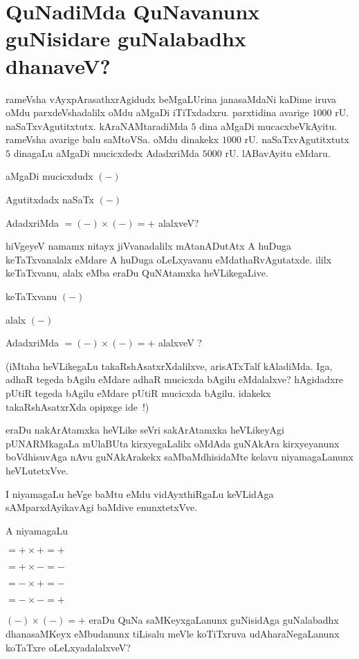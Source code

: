 \chapter{QuNadiMda QuNavanunx guNisidare guNalabadhx dhanaveV?}

rameVsha vAyxpArasathxrAgidudx beMgaLUrina janasaMdaNi kaDime iruva oMdu parxdeVshadalilx oMdu aMgaDi iTiTxdadxru. parxtidina avarige $1000$ rU. naSaTxvAgutitxtutx.  kAraNAMtaradiMda $5$ dina aMgaDi mucacxbeVkAyitu. rameVsha avarige balu saMtoVSa. oMdu dinakekx $1000$ rU. naSaTxvAgutitxtutx $5$ dinagaLu aMgaDi mucicxdedx AdadxriMda $5000$ rU. lABavAyitu eMdaru. 

aMgaDi mucicxdudx $(-)$

Agutitxdadx naSaTx $(-)$

AdadxriMda $= (-) \times (-) = + $ alalxveV?

hiVgeyeV namamx nitayx jiVvanadalilx mAtanADutAtx A huDuga keTaTxvanalalx eMdare A huDuga oLeLxyavanu eMdathaRvAgutatxde. ililx keTaTxvanu, alalx eMba eraDu QuNAtamxka heVLikegaLive.

keTaTxvanu $(-)$

alalx $(-)$

AdadxriMda $= (-) \times  (-) = +$ alalxveV ?

(iMtaha heVLikegaLu takaRshAsatxrXdalilxve, arisATxTalf kAladiMda. Iga, adhaR tegeda bAgilu eMdare adhaR mucicxda bAgilu eMdalalxve? hAgidadxre pUtiR tegeda bAgilu eMdare pUtiR mucicxda bAgilu. idakekx takaRshAsatxrXda opipxge ide~!)

eraDu nakArAtamxka heVLike seVri sakArAtamxka heVLikeyAgi pUNARMkagaLa mUlaBUta kirxyegaLalilx oMdAda guNAkAra kirxyeyanunx boVdhisuvAga nAvu guNAkArakekx saMbaMdhisidaMte kelavu niyamagaLanunx heVLutetxVve.

I niyamagaLu heVge baMtu eMdu vidAyxthiRgaLu keVLidAga sAMparxdAyikavAgi baMdive enunxtetxVve.

A niyamagaLu

$= + \times + = +$

$= + \times - = -$

$= - \times + = -$

$= - \times - = +$

$(-) \times (-) = +$ eraDu QuNa saMKeyxgaLanunx guNisidAga guNalabadhx dhanasaMKeyx eMbudanunx tiLisalu meVle koTiTxruva udAharaNegaLanunx koTaTxre oLeLxyadalalxveV?
